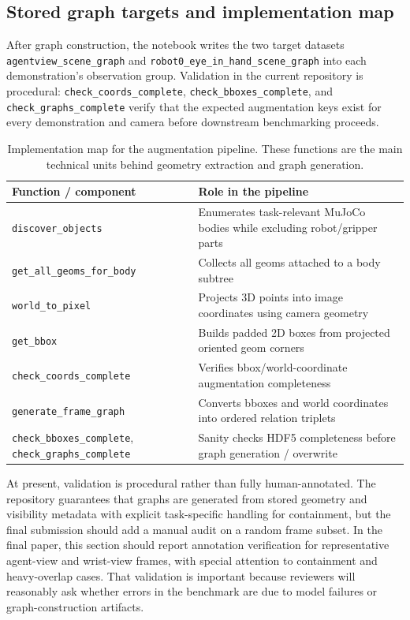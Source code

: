 \documentclass{article}
\begin{document}
\subsection{Stored graph targets and implementation map}
After graph construction, the notebook writes the two target datasets \texttt{agentview\_scene\_graph} and \texttt{robot0\_eye\_in\_hand\_scene\_graph} into each demonstration's observation group. Validation in the current repository is procedural: \texttt{check\_coords\_complete}, \texttt{check\_bboxes\_complete}, and \texttt{check\_graphs\_complete} verify that the expected augmentation keys exist for every demonstration and camera before downstream benchmarking proceeds.

\begin{table}[t]
    \caption{Implementation map for the augmentation pipeline. These functions are the main technical units behind geometry extraction and graph generation.}
    \label{tab:impl-augmentation}
    \centering
    \begin{tabularx}{\linewidth}{lX}
        \toprule
        Function / component & Role in the pipeline \\
        \midrule
        \texttt{discover\_objects} & Enumerates task-relevant MuJoCo bodies while excluding robot/gripper parts \\
        \texttt{get\_all\_geoms\_for\_body} & Collects all geoms attached to a body subtree \\
        \texttt{world\_to\_pixel} & Projects 3D points into image coordinates using camera geometry \\
        \texttt{get\_bbox} & Builds padded 2D boxes from projected oriented geom corners \\
        \texttt{check\_coords\_complete} & Verifies bbox/world-coordinate augmentation completeness \\
        \texttt{generate\_frame\_graph} & Converts bboxes and world coordinates into ordered relation triplets \\
        \texttt{check\_bboxes\_complete}, \texttt{check\_graphs\_complete} & Sanity checks HDF5 completeness before graph generation / overwrite \\
        \bottomrule
    \end{tabularx}
\end{table}

At present, validation is procedural rather than fully human-annotated. The repository guarantees that graphs are generated from stored geometry and visibility metadata with explicit task-specific handling for containment, but the final submission should add a manual audit on a random frame subset. In the final paper, this section should report annotation verification for representative agent-view and wrist-view frames, with special attention to containment and heavy-overlap cases. That validation is important because reviewers will reasonably ask whether errors in the benchmark are due to model failures or graph-construction artifacts.
\end{document}
